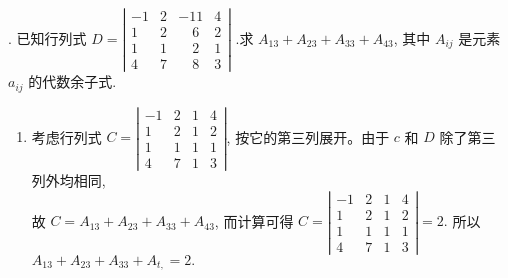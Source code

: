 \documentclass{article}
\begin{document}
\vspace{1ex}
{.} 已知行列式 $D=\left|\begin{array}{cccc}
        -1 & 2 & -11    & 4 \\
        1  & 2 & \quad6 & 2 \\
        1  & 1 & \quad2 & 1 \\ 4 & 7 & \quad8 & 3
    \end{array}\right| $ .求 $A_{13}+A_{23}+A_{33}+A_{43}$, 其中 $A_{ij}$ 是元素
$a_{ij}$ 的代数余子式.

\begin{enumerate}[\qquad 解： ]
    \item 考虑行列式 $C=\left|\begin{array}{cccc}
                  -1 & 2 & 1 & 4 \\
                  1  & 2 & 1 & 2 \\
                  1  & 1 & 1 & 1 \\
                  4  & 7 & 1 & 3
              \end{array}\right|$, 按它的第三列展开。由于 $c$ 和 $D$ 除了第三
          列外均相同,\\
          故 $C=A_{13}+A_{23}+A_{33}+A_{43}$, 而计算可得
          $C=\left|\begin{array}{cccc}
                  -1 & 2 & 1 & 4 \\
                  1  & 2 & 1 & 2 \\
                  1  & 1 & 1 & 1 \\
                  4  & 7 & 1 & 3
              \end{array}\right|=2 .$
          所以 $A_{13}+A_{23}+A_{33}+A_{t,}=2 .$ \\
\end{enumerate}
\end{document}
